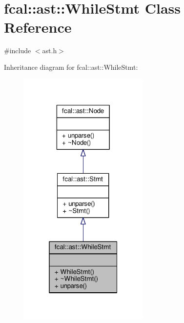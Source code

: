 \hypertarget{classfcal_1_1ast_1_1WhileStmt}{}\section{fcal\+:\+:ast\+:\+:While\+Stmt Class Reference}
\label{classfcal_1_1ast_1_1WhileStmt}


{\ttfamily \#include $<$ast.\+h$>$}



Inheritance diagram for fcal\+:\+:ast\+:\+:While\+Stmt\+:
\nopagebreak
\begin{figure}[H]
\begin{center}
\leavevmode
\includegraphics[width=184pt]{classfcal_1_1ast_1_1WhileStmt__inherit__graph}
\end{center}
\end{figure}


